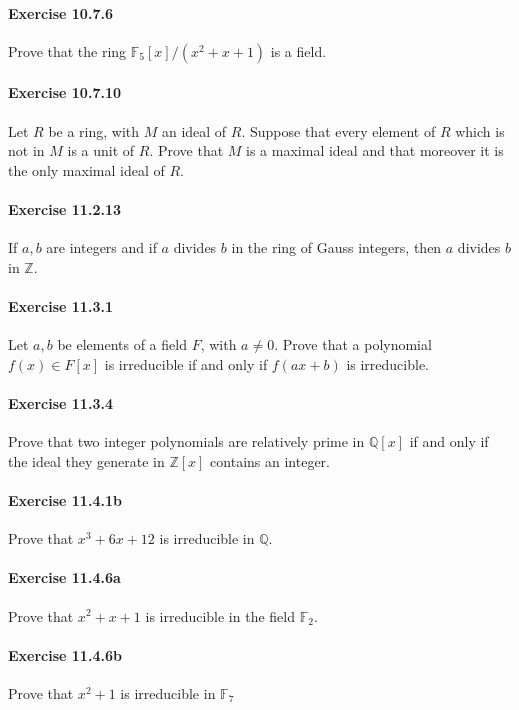 \documentclass{article}
\begin{document}
\paragraph{Exercise 10.7.6} Prove that the ring $\mathbb{F}_5[x] /\left(x^2+x+1\right)$ is a field.


\paragraph{Exercise 10.7.10} Let $R$ be a ring, with $M$ an ideal of $R$. Suppose that every element of $R$ which is not in $M$ is a unit of $R$. Prove that $M$ is a maximal ideal and that moreover it is the only maximal ideal of $R$.


\paragraph{Exercise 11.2.13} If $a, b$ are integers and if $a$ divides $b$ in the ring of Gauss integers, then $a$ divides $b$ in $\mathbb{Z}$.


\paragraph{Exercise 11.3.1} Let $a, b$ be elements of a field $F$, with $a \neq 0$. Prove that a polynomial $f(x) \in F[x]$ is irreducible if and only if $f(a x+b)$ is irreducible.


\paragraph{Exercise 11.3.4} Prove that two integer polynomials are relatively prime in $\mathbb{Q}[x]$ if and only if the ideal they generate in $\mathbb{Z}[x]$ contains an integer.


\paragraph{Exercise 11.4.1b} Prove that $x^3 + 6x + 12$ is irreducible in $\mathbb{Q}$.


\paragraph{Exercise 11.4.6a} Prove that $x^2+x+1$ is irreducible in the field $\mathbb{F}_2$.


\paragraph{Exercise 11.4.6b} Prove that $x^2+1$ is irreducible in $\mathbb{F}_7$
\end{document}
